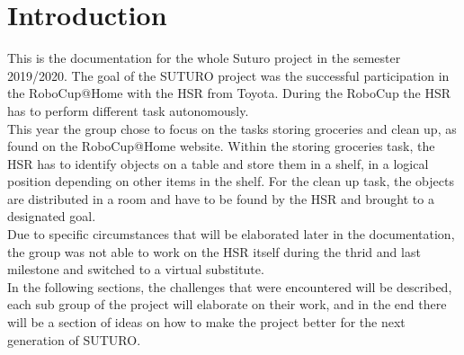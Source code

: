 \documentclass[main.tex]{subfiles}
\begin{document}
	\chapter{Introduction}

This is the documentation for the whole Suturo project in the semester 2019/2020. The goal of the SUTURO project was the successful participation in the RoboCup@Home with the HSR from Toyota. During the RoboCup the HSR has to perform different task autonomously.\\ 
This year the group chose to focus on the tasks storing groceries and clean up, as found on the RoboCup@Home website. Within the storing groceries task, the HSR has to identify objects on a table and store them in a shelf, in a logical position depending on other items in the shelf. For the clean up task, the objects are distributed in a room and have to be found by the HSR and brought to a designated goal.\\
Due to specific circumstances that will be elaborated later in the documentation, the group was not able to work on the HSR itself during the thrid and last milestone and switched to a virtual substitute.\\
In the following sections, the challenges that were encountered will be described, each sub group of the project will elaborate on their work, and in the end there will be a section of ideas on how to make the project better for the next generation of SUTURO.\\
	
\end{document}
